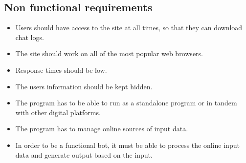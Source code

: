 \subsection{Non functional requirements}


\begin{itemize}
    \item Users should have access to the site at all times, so that they can download chat logs.
    \item The site should work on all of the most popular web browsers.
    \item Response times should be low.
    \item The users information should be kept hidden.
    \item The program has to be able to run as a standalone
program or in tandem with other digital platforms.
    \item The program has to manage online sources of input data.
    \item In order to be a functional bot, it must be able to process the online
input data and generate output based on the input.
\end{itemize}
